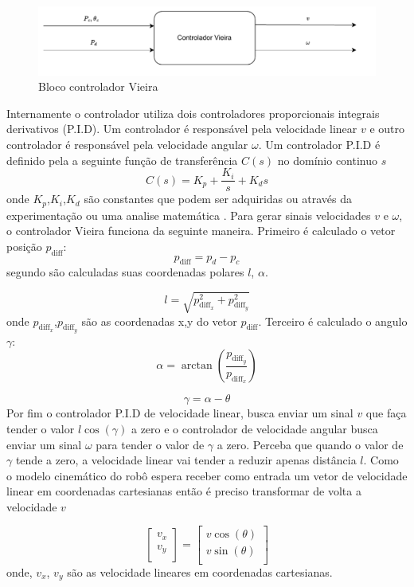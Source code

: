 \begin{figure}[H]
    \centering
    \includegraphics[scale=0.8]{figuras/controlador_viera.pdf}
    \caption{Bloco controlador Vieira}
\end{figure}

Internamente o controlador utiliza  dois controladores proporcionais
integrais derivativos (P.I.D). Um controlador é responsável pela
velocidade linear $v$
e outro controlador é responsável pela velocidade angular $\omega$. 
Um controlador P.I.D é definido pela a seguinte função de
transferência $C(s)$ no domínio continuo $s$
\begin{equation}
    C(s) = K_p + \frac{K_i}{s} + K_ds
\end{equation}
onde $K_p$,$K_i$,$K_d$ são constantes que podem ser adquiridas ou
através da experimentação ou uma analise matemática \cite{ogata2010modern}. Para gerar sinais
velocidades $v$ e $\omega$, o controlador Vieira funciona da seguinte
maneira. Primeiro é calculado o vetor posição $p_{\text{diff}}$:
\[
    p_{\text{diff}} = p_d - p_c 
\]
segundo são calculadas suas coordenadas polares $l$, $\alpha$.

\[
    l = \sqrt{p_{\text{diff}_x}^2 + p_{\text{diff}_y}^2}
\]
onde $p_{\text{diff}_x}$,$p_{\text{diff}_y}$ são as coordenadas x,y
do vetor $p_{\text{diff}}$.  Terceiro é calculado o angulo $\gamma$:
\[
    \alpha =  \arctan(\frac{ p_{\text{diff}_y}}{p_{\text{diff}_x}}) 
\]

\[
    \gamma =  \alpha - \theta
\]
Por fim o controlador P.I.D de velocidade
linear, busca enviar um sinal $v$ que faça tender o valor $l \cos(\gamma)$
a zero e o controlador de velocidade angular busca enviar um sinal $\omega$
para  tender o valor de $\gamma$ a zero. Perceba que quando o valor de $\gamma$
tende a zero, a velocidade linear vai tender a reduzir apenas
distância $l$. Como o modelo cinemático do robô espera receber como entrada
um vetor de velocidade linear em coordenadas cartesianas então é preciso
transformar de volta a velocidade $v$ 

\[
    \begin{bmatrix}
        v_x \\
        v_y \\
    \end{bmatrix}
    =
    \begin{bmatrix}
        v\cos(\theta) \\
        v\sin(\theta) \\
    \end{bmatrix}
\]
onde, $v_x$, $v_y$ são as velocidade lineares em coordenadas cartesianas.
